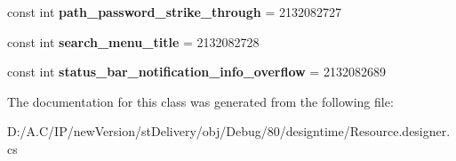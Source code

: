 \begin{DoxyCompactItemize}
const int {\bfseries path\+\_\+password\+\_\+strike\+\_\+through} = 2132082727
\item 
\mbox{\label{classst_delivery_1_1_resource_1_1_string_a6fe66bedefbd004723ab93fa09eb2f3f}} 
const int {\bfseries search\+\_\+menu\+\_\+title} = 2132082728
\item 
\mbox{\label{classst_delivery_1_1_resource_1_1_string_a064eb3da49a2b751fdbfcba21d5ac15b}} 
const int {\bfseries status\+\_\+bar\+\_\+notification\+\_\+info\+\_\+overflow} = 2132082689
\end{DoxyCompactItemize}


The documentation for this class was generated from the following file\+:\begin{DoxyCompactItemize}
\item 
D\+:/\+A.\+C/\+I\+P/new\+Version/st\+Delivery/obj/\+Debug/80/designtime/Resource.\+designer.\+cs\end{DoxyCompactItemize}
